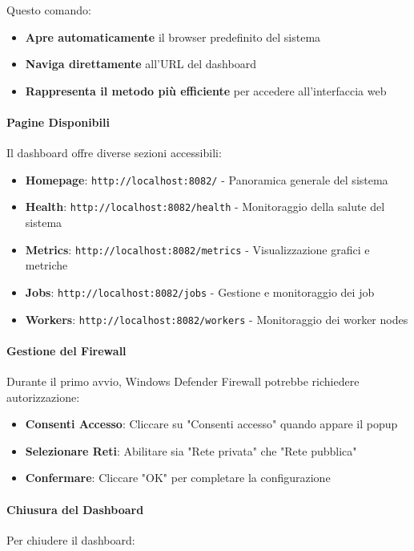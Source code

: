 \documentclass[12pt,a4paper]{article}
\begin{document}
Questo comando:
\begin{itemize}
\item \textbf{Apre automaticamente} il browser predefinito del sistema
\item \textbf{Naviga direttamente} all'URL del dashboard
\item \textbf{Rappresenta il metodo più efficiente} per accedere all'interfaccia web
\end{itemize}

\paragraph{Pagine Disponibili}
Il dashboard offre diverse sezioni accessibili:

\begin{itemize}
\item \textbf{Homepage}: \texttt{http://localhost:8082/} - Panoramica generale del sistema
\item \textbf{Health}: \texttt{http://localhost:8082/health} - Monitoraggio della salute del sistema
\item \textbf{Metrics}: \texttt{http://localhost:8082/metrics} - Visualizzazione grafici e metriche
\item \textbf{Jobs}: \texttt{http://localhost:8082/jobs} - Gestione e monitoraggio dei job
\item \textbf{Workers}: \texttt{http://localhost:8082/workers} - Monitoraggio dei worker nodes
\end{itemize}

\paragraph{Gestione del Firewall}
Durante il primo avvio, Windows Defender Firewall potrebbe richiedere autorizzazione:

\begin{itemize}
\item \textbf{Consenti Accesso}: Cliccare su "Consenti accesso" quando appare il popup
\item \textbf{Selezionare Reti}: Abilitare sia "Rete privata" che "Rete pubblica"
\item \textbf{Confermare}: Cliccare "OK" per completare la configurazione
\end{itemize}

\paragraph{Chiusura del Dashboard}
Per chiudere il dashboard:
\end{document}
